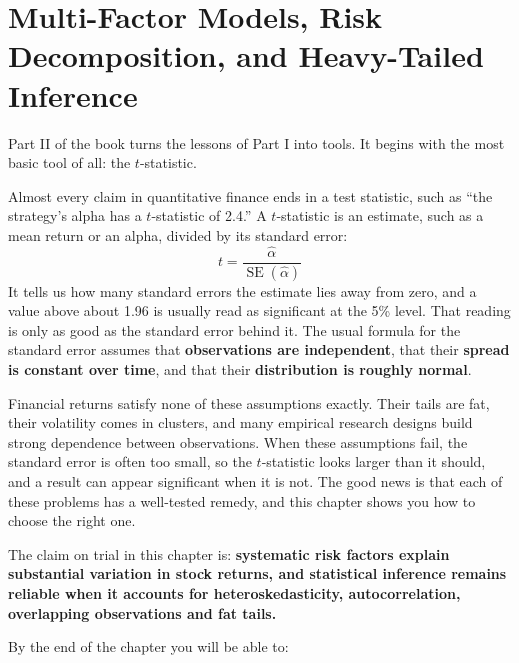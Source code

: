 \chapter{Multi-Factor Models, Risk Decomposition, and Heavy-Tailed Inference}
\label{ch:03}

Part II of the book turns the lessons of Part I into tools. It begins with the most basic tool of all: the $t$-statistic.

Almost every claim in quantitative finance ends in a test statistic, such as ``the strategy's alpha has a $t$-statistic of 2.4.'' A $t$-statistic is an estimate, such as a mean return or an alpha, divided by its standard error:
\begin{equation}
  t = \frac{\hat{\alpha}}{\operatorname{SE}(\hat{\alpha})}
  \label{eq:03-tstat}
\end{equation}
It tells us how many standard errors the estimate lies away from zero, and a value above about 1.96 is usually read as significant at the 5\% level. That reading is only as good as the standard error behind it. The usual formula for the standard error assumes that \textbf{observations are independent}, that their \textbf{spread is constant over time}, and that their \textbf{distribution is roughly normal}.

Financial returns satisfy none of these assumptions exactly. Their tails are fat, their volatility comes in clusters, and many empirical research designs build strong dependence between observations. When these assumptions fail, the standard error is often too small, so the $t$-statistic looks larger than it should, and a result can appear significant when it is not. The good news is that each of these problems has a well-tested remedy, and this chapter shows you how to choose the right one.

The claim on trial in this chapter is: \textbf{systematic risk factors explain substantial variation in stock returns, and statistical inference remains reliable when it accounts for heteroskedasticity, autocorrelation, overlapping observations and fat tails.}

By the end of the chapter you will be able to:

